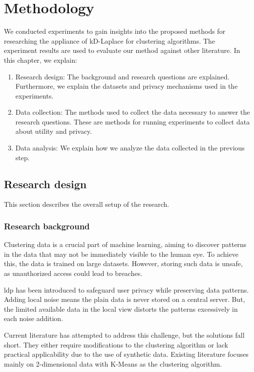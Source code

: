 \chapter{Methodology}

We conducted experiments to gain insights into the proposed methods for researching the appliance of kD-Laplace for clustering algorithms.
The experiment results are used to evaluate our method against other literature.
In this chapter, we explain:
\begin{enumerate}
      \item Research design: The background and research questions are explained.
            Furthermore, we explain the datasets and privacy mechanisms used in the experiments.
      \item Data collection: The methods used to collect the data necessary to answer the research questions.
            These are methods for running experiments to collect data about utility and privacy.
      \item Data analysis: We explain how we analyze the data collected in the previous step.
\end{enumerate}

\section{Research design}
This section describes the overall setup of the research.
\subsection{Research background}
Clustering data is a crucial part of machine learning, aiming to discover patterns in the data that may not be immediately visible to the human eye.
To achieve this, the data is trained on large datasets.
However, storing such data is unsafe, as unauthorized access could lead to breaches.

\gls{ldp} has been introduced to safeguard user privacy while preserving data patterns.
Adding local noise means the plain data is never stored on a central server.
But, the limited available data in the local view distorts the patterns excessively in each noise addition.

Current literature has attempted to address this challenge, but the solutions fall short.
They either require modifications to the clustering algorithm or lack practical applicability due to the use of synthetic data.
Existing literature focuses mainly on 2-dimensional data with K-Means as the clustering algorithm.

